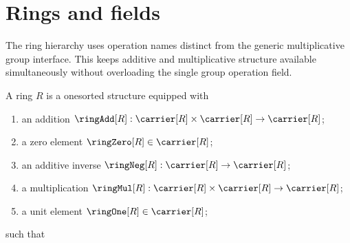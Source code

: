 

\section{Rings and fields}

The ring hierarchy uses operation names distinct from the generic multiplicative
group interface.  This keeps additive and multiplicative structure available
simultaneously without overloading the single group operation field.

\begin{struct}\label{ring}
    A ring $R$ is a onesorted structure equipped with
    \begin{enumerate}
        \item\label{ring_add_graph}
            an addition
            $\ringAdd[R]:\carrier[R]\times\carrier[R]\to\carrier[R]$;
        \item\label{ring_zero_type}
            a zero element $\ringZero[R]\in\carrier[R]$;
        \item\label{ring_neg_graph}
            an additive inverse
            $\ringNeg[R]:\carrier[R]\to\carrier[R]$;
        \item\label{ring_mul_graph}
            a multiplication
            $\ringMul[R]:\carrier[R]\times\carrier[R]\to\carrier[R]$;
        \item\label{ring_one_type}
            a unit element $\ringOne[R]\in\carrier[R]$;
    \end{enumerate}
    such that
\end{struct}
